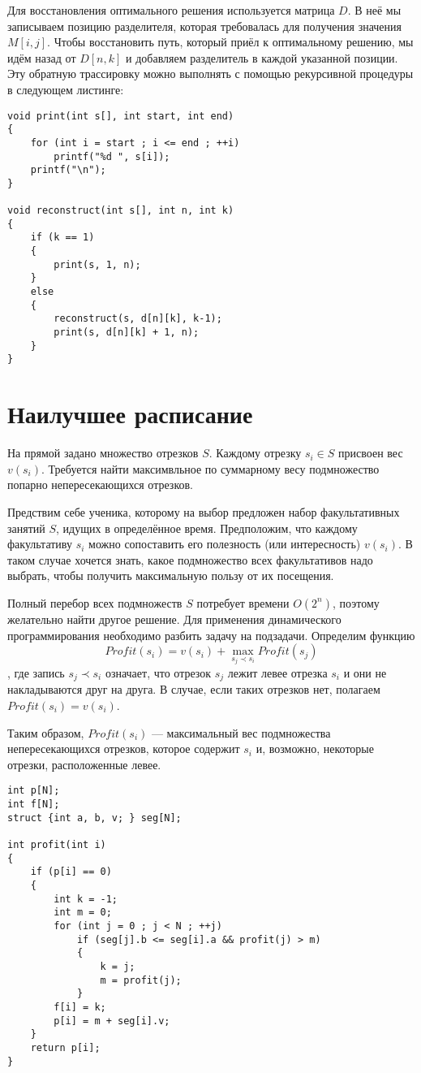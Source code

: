 \documentclass[14pt,openany]{book}
\begin{document}
Для восстановления оптимального решения используется матрица $D$. В неё мы записываем
позицию разделителя, которая требовалась для получения значения $M[i,j]$. Чтобы
восстановить путь, который приёл к оптимальному решению, мы идём назад от $D[n,k]$
и добавляем разделитель в каждой указанной позиции. Эту обратную трассировку можно
выполнять с помощью рекурсивной процедуры в следующем листинге:

\begin{lstlisting}
void print(int s[], int start, int end)
{
    for (int i = start ; i <= end ; ++i)
        printf("%d ", s[i]);
    printf("\n");
}

void reconstruct(int s[], int n, int k)
{
    if (k == 1)
    {
        print(s, 1, n);
    }
    else
    {
        reconstruct(s, d[n][k], k-1);
        print(s, d[n][k] + 1, n);
    }
}
\end{lstlisting}


\section{Наилучшее расписание}

На прямой задано множество отрезков $S$. Каждому отрезку $s_i \in S$ присвоен вес $v(s_i)$.
Требуется найти максимвльное по суммарному весу подмножество попарно непересекающихся отрезков.

Предствим себе ученика, которому на выбор предложен набор факультативных занятий $S$, идущих
в определённое время. Предположим, что каждому факультативу $s_i$ можно сопоставить
его полезность (или интересность) $v(s_i)$. В таком случае хочется знать, какое подмножество
всех факультативов надо выбрать, чтобы получить максимальную пользу от их посещения.

Полный перебор всех подмножеств $S$ потребует времени $O(2^n)$, поэтому желательно найти другое
решение. Для применения динамического программирования необходимо разбить задачу на подзадачи.
Определим функцию
$$Profit(s_i) = v(s_i) + \max_{s_j \prec s_i}Profit(s_j)$$,
где запись $s_j \prec s_i$ означает, что отрезок $s_j$ лежит левее отрезка $s_i$ и они
не накладываются друг на друга. В случае, если таких отрезков нет, полагаем
$Profit(s_i) = v(s_i)$.

Таким образом, $Profit(s_i)$ --- максимальный вес подмножества непересекающихся отрезков,
которое содержит $s_i$ и, возможно, некоторые отрезки, расположенные левее.

\begin{lstlisting}
int p[N];
int f[N];
struct {int a, b, v; } seg[N];

int profit(int i)
{
    if (p[i] == 0)
    {
        int k = -1;
        int m = 0;
        for (int j = 0 ; j < N ; ++j)
            if (seg[j].b <= seg[i].a && profit(j) > m)
            {
                k = j;
                m = profit(j);
            }
        f[i] = k;
        p[i] = m + seg[i].v;
    }
    return p[i];
}
\end{lstlisting}
\end{document}
